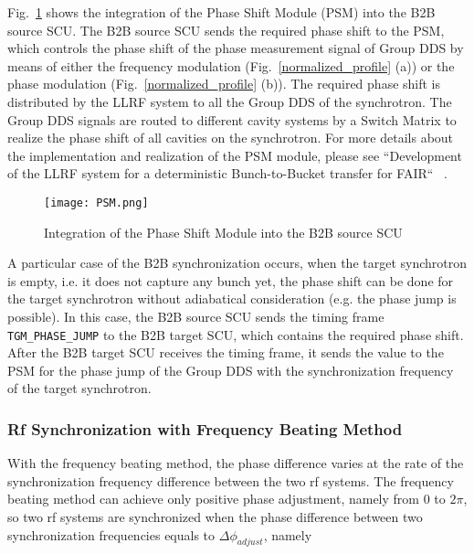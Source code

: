 Fig.~\ref{PSM} shows the integration of the Phase Shift Module (PSM) into the B2B source SCU. The B2B source SCU sends the required phase shift to the \gls{PSM}, which controls the phase shift of the phase measurement signal of Group DDS by means of either the frequency modulation (Fig.~\ref{normalized_profile} (a)) or the phase modulation (Fig.~\ref{normalized_profile} (b)). The required phase shift is distributed by the LLRF system to all the Group DDS of the synchrotron. The Group DDS signals are routed to different cavity systems by a Switch Matrix to realize the phase shift of all cavities on the synchrotron. For more details about the implementation and realization of the PSM module, please see ``Development of the LLRF system for a deterministic Bunch-to-Bucket transfer for FAIR`` ~\cite{ferrand_development_????}.
  \begin{figure}[!htb]
   \centering   
   \texttt{[image: PSM.png]}
   \caption{Integration of the Phase Shift Module into the B2B source SCU}
   \label{PSM}
\end{figure}                     

A particular case of the B2B synchronization occurs, when the target synchrotron is empty, i.e. it does not capture any bunch yet, the phase shift can be done for the target synchrotron without adiabatical consideration (e.g. the phase jump is possible). In this case, the B2B source SCU sends the timing frame \verb|TGM_PHASE_JUMP| to the B2B target SCU, which contains the required phase shift. After the B2B target SCU receives the timing frame, it sends the value to the PSM for the phase jump of the Group DDS with the synchronization frequency of the target synchrotron.

\subsubsection{Rf Synchronization with Frequency Beating Method}

With the frequency beating method, the phase difference varies at the rate of the synchronization frequency difference between the two rf systems. The frequency beating method can achieve only positive phase adjustment, namely from 0 to $2\pi$, so two rf systems are synchronized when the phase difference between two synchronization frequencies equals to $\Delta \phi_\mathit{adjust}$, namely
%
%
%
%

